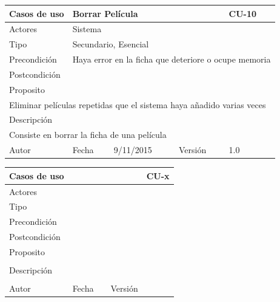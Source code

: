 \documentclass{article}
\begin{document}
\begin{table}[h]
\begin{tabular}{|l|l|l|l|l|l|}
\hline
\multicolumn{2}{|p{2cm}|}{Casos de uso}  & \multicolumn{3}{p{7cm}|}{Borrar Película} & CU-10 \\
\hline
\multicolumn{2}{|p{2cm}|}{Actores}       & \multicolumn{4}{p{8cm}|}{Sistema}        \\
\hline
\multicolumn{2}{|p{2cm}|}{Tipo}          & \multicolumn{4}{p{8cm}|}{Secundario, Esencial}        \\
\hline
\multicolumn{2}{|p{2cm}|}{Precondición}  & \multicolumn{4}{p{8cm}|}{Haya error en la ficha que deteriore o ocupe memoria}        \\
\hline
\multicolumn{2}{|p{2cm}|}{Postcondición} & \multicolumn{4}{p{8cm}|}{}        \\
\hline
\multicolumn{6}{|p{10cm}|}{Proposito}                                   \\
\hline
\multicolumn{6}{|p{10cm}|}{Eliminar películas repetidas que el sistema haya añadido varias veces}                                            \\
\hline
\multicolumn{6}{|p{10cm}|}{Descripción}                                 \\
\hline
\multicolumn{6}{|p{10cm}|}{Consiste en borrar la ficha de una película}                                            \\
\hline
Autor              &              & Fecha    & 9/11/2015    &   Versión  &1.0\\
\hline
\end{tabular}
\end{table}


\begin{table}[h]
\begin{tabular}{|l|l|l|l|l|l|}
\hline
\multicolumn{2}{|p{2cm}|}{Casos de uso}  & \multicolumn{3}{p{7cm}|}{} & CU-x \\
\hline
\multicolumn{2}{|p{2cm}|}{Actores}       & \multicolumn{4}{p{8cm}|}{}        \\
\hline
\multicolumn{2}{|p{2cm}|}{Tipo}          & \multicolumn{4}{p{8cm}|}{}        \\
\hline
\multicolumn{2}{|p{2cm}|}{Precondición}  & \multicolumn{4}{p{8cm}|}{}        \\
\hline
\multicolumn{2}{|p{2cm}|}{Postcondición} & \multicolumn{4}{p{8cm}|}{}        \\
\hline
\multicolumn{6}{|p{10cm}|}{Proposito}                                   \\
\hline
\multicolumn{6}{|p{10cm}|}{}                                            \\
\hline
\multicolumn{6}{|p{10cm}|}{Descripción}                                 \\
\hline
\multicolumn{6}{|p{10cm}|}{}                                            \\
\hline
Autor              &              & Fecha    &     &   Versión  &\\     
\hline
\end{tabular}
\end{table}
\end{document}
